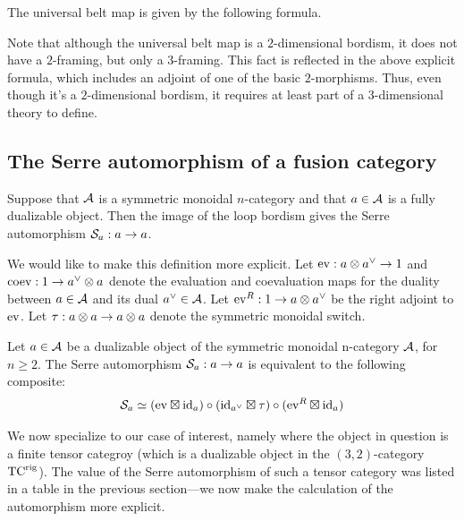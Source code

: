 \documentclass{amsart}
\begin{document}
\begin{lemma}
The universal belt map is given by the following formula.   
\end{lemma}

\begin{remark}
Note that although the universal belt map is a $2$-dimensional bordism, it does not have a $2$-framing, but only a $3$-framing.  This fact is reflected in the above explicit formula, which includes an adjoint of one of the basic $2$-morphisms.  Thus, even though it's a $2$-dimensional bordism, it requires at least part of a $3$-dimensional theory to define.  
\end{remark}

\subsection{The Serre automorphism of a fusion category}

Suppose that $\mathcal A$ is a symmetric monoidal $n$-category and that $a \in \mathcal A$ is a fully dualizable object.  Then the image of the loop bordism gives the Serre automorphism $\mathcal S_a: a \rightarrow a$.

We would like to make this definition more explicit.  Let $\mathrm{ev} : a \otimes a^{\vee} \rightarrow 1$ and $\mathrm{coev}: 1 \rightarrow a^{\vee} \otimes a$ denote the evaluation and coevaluation maps for the duality between $a \in \mathcal A$ and its dual $a^{\vee} \in \mathcal A$.  Let $\mathrm{ev}^R: 1 \rightarrow a \otimes a^{\vee}$ be the right adjoint to $\mathrm{ev}$.  Let $\tau: a \otimes a \rightarrow a \otimes a$ denote the symmetric monoidal switch.  

\begin{proposition}
Let $a \in \mathcal A$ be a dualizable object of the symmetric monoidal n-category $\mathcal A$, for $n \geq 2$.  The Serre automorphism $\mathcal S_a : a \rightarrow a$ is equivalent to the following composite:
\[
\mathcal S_a \simeq (\mathrm{ev} \boxtimes \mathrm{id}_a) \circ (\mathrm{id}_{a^{\vee}} \boxtimes \tau) \circ (\mathrm{ev}^R \boxtimes \mathrm{id}_a)
\] 
\end{proposition}

We now specialize to our case of interest, namely where the object in question is a finite tensor categroy (which is a dualizable object in the $(3,2)$-category ${\mathrm{TC}^{\text{rig}}}$).  The value of the Serre automorphism of such a tensor category was listed in a table in the previous section---we now make the calculation of the automorphism more explicit.

\end{document}
